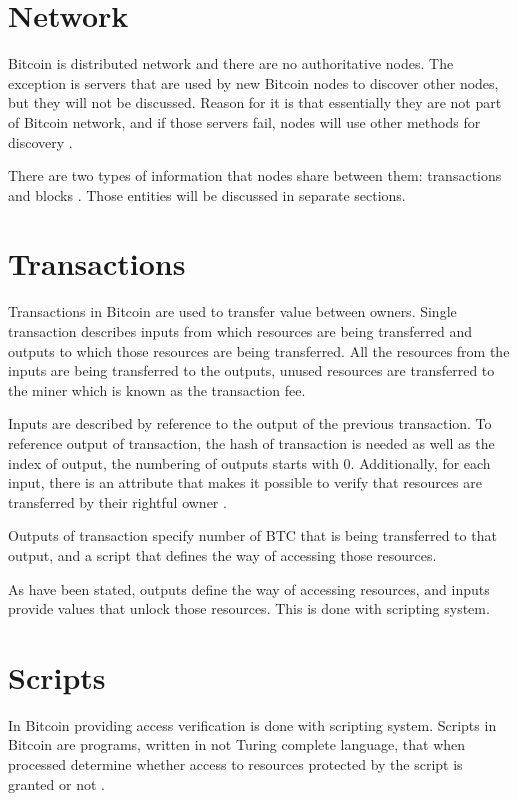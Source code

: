 \documentclass[12pt, en, eng, twoside, final]{mgr}
\begin{document}
\section{Network}
Bitcoin is distributed network and there are no authoritative nodes. The exception is servers that are used by new Bitcoin nodes to discover other nodes, but they will not be discussed. Reason for it is that essentially they are not part of Bitcoin network, and if those servers fail, nodes will use other methods for discovery \cite{bitcoin-paper-1}.

There are two types of information that nodes share between them: transactions and blocks \cite{bitcoin-paper-1}. Those entities will be discussed in separate sections.

\section{Transactions}
Transactions in Bitcoin are used to transfer value between owners. Single transaction describes inputs from which resources are being transferred and outputs to which those resources are being transferred. All the resources from the inputs are being transferred to the outputs, unused resources are transferred to the miner which is known as the transaction fee.

Inputs are described by reference to the output of the previous transaction. To reference output of transaction, the hash of transaction is needed as well as the index of output, the numbering of outputs starts with 0. Additionally, for each input, there is an attribute that makes it possible to verify that resources are transferred by their rightful owner \cite{bitcoin-transaction}.

Outputs of transaction specify number of BTC that is being transferred to that output, and a script that defines the way of accessing those resources. 

As have been stated, outputs define the way of accessing resources, and inputs provide values that unlock those resources. This is done with scripting system.

\section{Scripts}
In Bitcoin providing access verification is done with scripting system. Scripts in Bitcoin are programs, written in not Turing complete language, that when processed determine whether access to resources protected by the script is granted or not \cite{bitcoin-script}.
\end{document}

